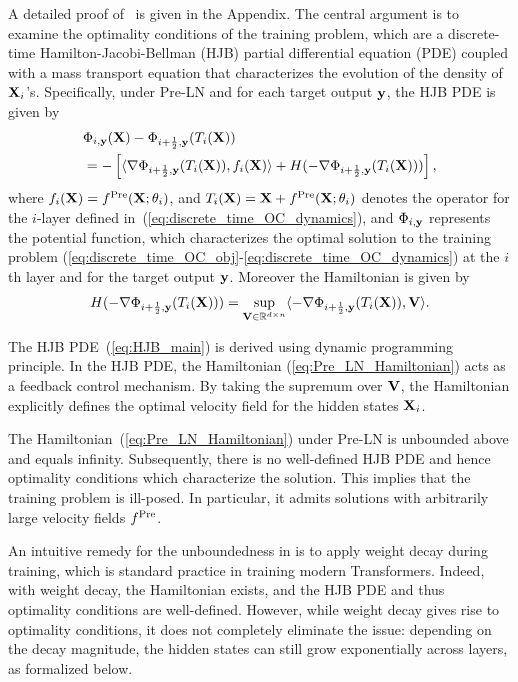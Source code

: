 \documentclass[journal]{IEEEtran}
\def\eqref#1{equation~\ref{#1}}
\newcommand{\bfV}{{\bf V}}
\newcommand{\bfX}{{\bf X}}
\newcommand{\bfy}{ {\bf y}}
\renewcommand{\eqref}[1]{(\ref{#1})}
\theoremstyle{plain}
\theoremstyle{definition}
\theoremstyle{remark}
\begin{document}
A detailed proof of~ is given in the Appendix. The central argument is to examine the optimality conditions of the training problem, which are a discrete-time Hamilton-Jacobi-Bellman (HJB) partial differential equation (PDE) coupled with a mass transport equation that characterizes the evolution of the density of $\bfX_i$'s. 
Specifically, under Pre-LN and for each target output $\bfy$, the HJB PDE is given by
\begin{align}\label{eq:HJB_main}
\begin{split}
    &\Phi_{i, \bfy}(\bfX) -\Phi_{i+\frac{1}{2}, \bfy}(T_i(\bfX)) \\ &= - \left[ \langle \nabla \Phi_{i+\frac{1}{2}, \bfy}(T_i(\bfX)), f_i(\bfX) \rangle 
    + H(-\nabla \Phi_{i+\frac{1}{2}, \bfy}(T_i(\bfX))) \right], 
\end{split}
\end{align}
where $f_i(\bfX) = f^{\rm Pre}(\bfX; \theta_i)$, and $T_i(\bfX) = \bfX + f^{\rm Pre}(\bfX; \theta_i)$ denotes the operator for the $i$-layer defined in~\eqref{eq:discrete_time_OC_dynamics}, and $\Phi_{i, \bfy}$ represents the potential function, which characterizes the optimal solution to the training problem (\ref{eq:discrete_time_OC_obj}-\ref{eq:discrete_time_OC_dynamics}) at the $i$th layer and for the target output $\bfy$. Moreover the Hamiltonian is given by
\begin{equation}\label{eq:Pre_LN_Hamiltonian}
    H(-\nabla \Phi_{i+\frac{1}{2}, \bfy}(T_i(\bfX))) = \sup_{\bfV \in \mathbb{R}^{d \times n}} \langle -\nabla \Phi_{i+\frac{1}{2}, \bfy}(T_i(\bfX)), \bfV \rangle.
\end{equation}

The HJB PDE~\eqref{eq:HJB_main} is derived using dynamic programming principle. In the HJB PDE, the Hamiltonian \eqref{eq:Pre_LN_Hamiltonian} acts as a feedback control mechanism. By taking the supremum over $\bfV$, the Hamiltonian explicitly defines the optimal velocity field for the hidden states $\bfX_i$.

The Hamiltonian~\eqref{eq:Pre_LN_Hamiltonian} under Pre-LN is unbounded above and equals infinity. Subsequently, there is no well-defined HJB PDE and hence optimality conditions which characterize the solution. This implies that the training problem is ill-posed. In particular, it admits solutions with arbitrarily large velocity fields $f^{\rm Pre}$.

An intuitive remedy for the unboundedness in  is to apply weight decay during training, which is standard practice in training modern Transformers. Indeed, with weight decay, the Hamiltonian exists, and the HJB PDE and thus optimality conditions are well-defined. However, while weight decay gives rise to optimality conditions, it does not completely eliminate the issue: depending on the decay magnitude, 
the hidden states can still grow exponentially across layers, as formalized below. 
\end{document}
